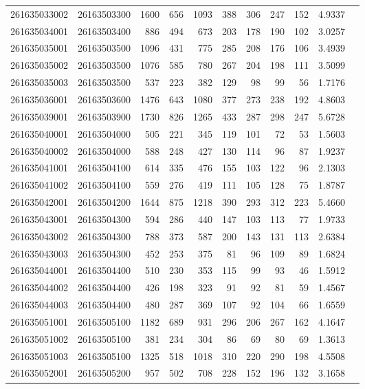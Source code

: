 \documentclass[11pt,landscape]{article}
\begin{document}
{\begin{longtable}[]{@{}lrrrrrrrrrr@{}}
261635033002 & 26163503300 & 1600 & 656 & 1093 & 388 & 306 & 247 & 152 & 4.9337 \\
261635034001 & 26163503400 & 886 & 494 & 673 & 203 & 178 & 190 & 102 & 3.0257 \\
261635035001 & 26163503500 & 1096 & 431 & 775 & 285 & 208 & 176 & 106 & 3.4939 \\
261635035002 & 26163503500 & 1076 & 585 & 780 & 267 & 204 & 198 & 111 & 3.5099 \\
261635035003 & 26163503500 & 537 & 223 & 382 & 129 & 98 & 99 & 56 & 1.7176 \\
261635036001 & 26163503600 & 1476 & 643 & 1080 & 377 & 273 & 238 & 192 & 4.8603 \\
261635039001 & 26163503900 & 1730 & 826 & 1265 & 433 & 287 & 298 & 247 & 5.6728 \\
261635040001 & 26163504000 & 505 & 221 & 345 & 119 & 101 & 72 & 53 & 1.5603 \\
261635040002 & 26163504000 & 588 & 248 & 427 & 130 & 114 & 96 & 87 & 1.9237 \\
261635041001 & 26163504100 & 614 & 335 & 476 & 155 & 103 & 122 & 96 & 2.1303 \\
261635041002 & 26163504100 & 559 & 276 & 419 & 111 & 105 & 128 & 75 & 1.8787 \\
261635042001 & 26163504200 & 1644 & 875 & 1218 & 390 & 293 & 312 & 223 & 5.4660 \\
261635043001 & 26163504300 & 594 & 286 & 440 & 147 & 103 & 113 & 77 & 1.9733 \\
261635043002 & 26163504300 & 788 & 373 & 587 & 200 & 143 & 131 & 113 & 2.6384 \\
261635043003 & 26163504300 & 452 & 253 & 375 & 81 & 96 & 109 & 89 & 1.6824 \\
261635044001 & 26163504400 & 510 & 230 & 353 & 115 & 99 & 93 & 46 & 1.5912 \\
261635044002 & 26163504400 & 426 & 198 & 323 & 91 & 92 & 81 & 59 & 1.4567 \\
261635044003 & 26163504400 & 480 & 287 & 369 & 107 & 92 & 104 & 66 & 1.6559 \\
261635051001 & 26163505100 & 1182 & 689 & 931 & 296 & 206 & 267 & 162 & 4.1647 \\
261635051002 & 26163505100 & 381 & 234 & 304 & 86 & 69 & 80 & 69 & 1.3613 \\
261635051003 & 26163505100 & 1325 & 518 & 1018 & 310 & 220 & 290 & 198 & 4.5508 \\
261635052001 & 26163505200 & 957 & 502 & 708 & 228 & 152 & 196 & 132 & 3.1658 \\

\end{longtable}}
\end{document}
